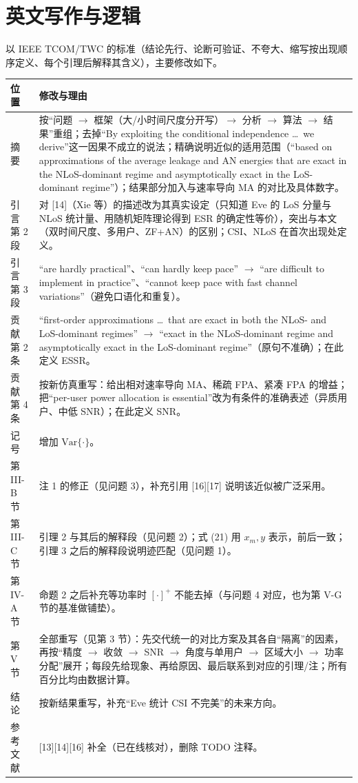 \documentclass[11pt,a4paper]{ctexart}
\newcommand{\old}[1]{{\color{red!70!black}#1}}
\newcommand{\new}[1]{{\color{blue!60!black}#1}}
\begin{document}
\section{英文写作与逻辑}
以 IEEE TCOM/TWC 的标准（结论先行、论断可验证、不夸大、缩写按出现顺序定义、每个引理后解释其含义），主要修改如下。
\begin{longtable}{p{2.3cm}p{13.4cm}}
\toprule
位置 & 修改与理由 \\ \midrule
摘要 & 按“问题 $\to$ 框架（大/小时间尺度分开写）$\to$ 分析 $\to$ 算法 $\to$ 结果”重组；去掉“By exploiting the conditional independence \ldots\ we derive”这一因果不成立的说法；精确说明近似的适用范围（“based on approximations of the average leakage and AN energies that are exact in the NLoS-dominant regime and asymptotically exact in the LoS-dominant regime”）；结果部分加入与速率导向 MA 的对比及具体数字。\\
引言第 2 段 & 对 [14]（Xie 等）的描述改为其真实设定（只知道 Eve 的 LoS 分量与 NLoS 统计量、用随机矩阵理论得到 ESR 的确定性等价），突出与本文（双时间尺度、多用户、ZF+AN）的区别；CSI、NLoS 在首次出现处定义。\\
引言第 3 段 & \old{``are hardly practical''}、\old{``can hardly keep pace''} $\to$ \new{``are difficult to implement in practice''}、\new{``cannot keep pace with fast channel variations''}（避免口语化和重复）。\\
贡献第 2 条 & \old{``first-order approximations \ldots\ that are exact in both the NLoS- and LoS-dominant regimes''} $\to$ \new{``exact in the NLoS-dominant regime and asymptotically exact in the LoS-dominant regime''}（原句不准确）；在此定义 ESSR。\\
贡献第 4 条 & 按新仿真重写：给出相对速率导向 MA、稀疏 FPA、紧凑 FPA 的增益；把“per-user power allocation is essential”改为有条件的准确表述（异质用户、中低 SNR）；在此定义 SNR。\\
记号 & 增加 $\mathrm{Var}\{\cdot\}$。\\
第 III-B 节 & 注 1 的修正（见问题 3），补充引用 [16][17] 说明该近似被广泛采用。\\
第 III-C 节 & 引理 2 与其后的解释段（见问题 2）；式 (21) 用 $x_m,y$ 表示，前后一致；引理 3 之后的解释段说明迹匹配（见问题 1）。\\
第 IV-A 节 & 命题 2 之后补充等功率时 $[\cdot]^+$ 不能去掉（与问题 4 对应，也为第 V-G 节的基准做铺垫）。\\
第 V 节 & 全部重写（见第 3 节）：先交代统一的对比方案及其各自“隔离”的因素，再按“精度 $\to$ 收敛 $\to$ SNR $\to$ 角度与单用户 $\to$ 区域大小 $\to$ 功率分配”展开；每段先给现象、再给原因、最后联系到对应的引理/注；所有百分比均由数据计算。\\
结论 & 按新结果重写，补充“Eve 统计 CSI 不完美”的未来方向。\\
参考文献 & [13][14][16] 补全（已在线核对），删除 TODO 注释。\\
\bottomrule
\end{longtable}
\end{document}

